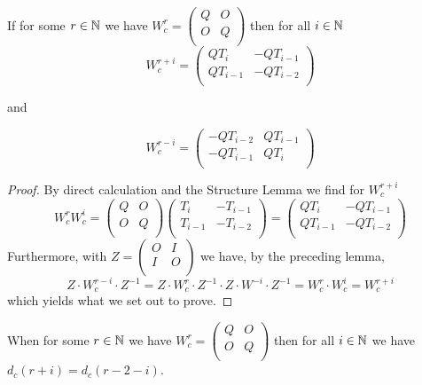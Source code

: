 \begin{lemma}
  If for some $r\in\mathbb{N}$ we have $W_{c}^{r} = \left(\begin{smallmatrix} Q & O \\ O & Q \\\end{smallmatrix}\right)$ then for all $i\in\mathbb{N}$
  \[
  W_{c}^{r+i} = \left(\begin{array}{cc} QT_{i} & -QT_{i-1} \\ QT_{i-1} & -QT_{i-2} \\\end{array}\right)
  \]

  and

  \[
  W_{c}^{r-i} = \left(\begin{array}{cc} -QT_{i-2} & QT_{i-1} \\ -QT_{i-1} & QT_{i} \\\end{array}\right)
  \]
\end{lemma}

\begin{proof}
  By direct calculation and the Structure Lemma we find for $W_{c}^{r+i}$
  \[
  W_{c}^{r}W_{c}^{i}
  =
  \left(
  \begin{array}{cc}
    Q & O \\
    O & Q \\
  \end{array}
  \right)
  \left(
  \begin{array}{cc}
    T_{i}   & -T_{i-1}  \\
    T_{i-1} & -T_{i-2} \\
  \end{array}
  \right)
  =
  \left(
  \begin{array}{cc}
    QT_{i}   & -QT_{i-1}  \\
    QT_{i-1} & -QT_{i-2} \\
  \end{array}
  \right)
  \]
  Furthermore, with $Z=\left(\begin{smallmatrix} O & I \\ I & O \\\end{smallmatrix}\right)$
  we have, by the preceding lemma,
  \[Z\cdot W_{c}^{r-i}\cdot Z^{-1}=Z\cdot W_{c}^{r}\cdot Z^{-1}\cdot Z\cdot W^{-i}\cdot Z^{-1}=W_{c}^{r}\cdot W_{c}^{i}=W_{c}^{r+i}\]
  which yields what we set out to prove.
\end{proof}

\begin{corollary}\label{mirror}
  When for some $r\in\mathbb{N}$ we have $W_{c}^{r} = \left(\begin{smallmatrix} Q & O \\ O & Q \\\end{smallmatrix}\right)$ then for all $i\in\mathbb{N}$ we have
  $d_{c}(r+i) = d_{c}(r-2-i)$.
\end{corollary}

